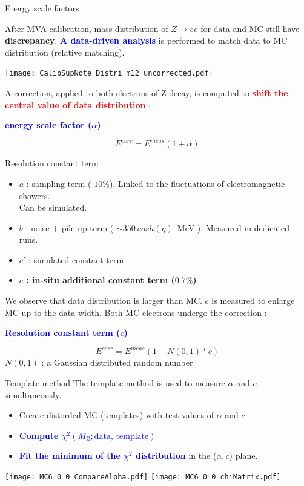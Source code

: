 \begin{frame}{Energy scale factors}
  \begin{minipage}{0.49\linewidth}
    After MVA calibration, mass distribution of $Z\rightarrow ee$ for data and MC still have {\bf discrepancy}.
    \newline
    \textcolor{blue}{\bf A data-driven analysis } is performed to match data to MC distribution (relative matching).
  \end{minipage}
  \hfill
  \begin{minipage}{0.49\linewidth}
    \texttt{[image: CalibSupNote\_Distri\_m12\_uncorrected.pdf]}
  \end{minipage}

A correction, applied to both electrons of Z decay, is computed to \textcolor{red}{\bf shift the central value of data distribution} : 
\begin{center} \textcolor{blue}{\bf energy scale factor ($\alpha$)} \end{center}
$$E^{corr}=E^{meas}(1+\alpha)$$
\end{frame}

\begin{frame}{Resolution constant term}
  
  \begin{itemize}
  \item $a$ : sampling term ( $10\%$). Linked to the fluctuations of electromagnetic showers. \\Can be simulated.
  \item $b$ : noise + pile-up term ( $\sim 350~cosh(\eta )$~MeV ). Measured in dedicated runs.
  \item $c'$ : simulated constant term
  \item {\bf $c$ : in-situ additional constant term ($0.7\%$)}
  \end{itemize}
  We observe that data distribution is larger than MC. 
  $c$ is measured to enlarge MC up to the data width.
  Both MC electrons undergo the correction :
  \begin{center}\textcolor{blue}{\bf Resolution constant term ($c$) }\end{center}
  $$E^{corr} = E^{meas}(1+N(0,1)*c)$$
  $N(0,1)$ : a Gaussian distributed random number
\end{frame}

\begin{frame}{Template method}
  The template method is used to measure $\alpha$ and $c$ simultaneously.
  \begin{itemize}
  \item Create distorded MC (templates) with test values of $\alpha$ and $c$
  \item \textcolor{blue}{\bf Compute $\chi^2( M_Z; \text{data, template})$}
  \item \textcolor{blue}{\bf Fit the minimum of the $\chi^2$ distribution} in the ($\alpha,c$) plane.
  \end{itemize}
  \hfill
  \texttt{[image: MC6\_0\_0\_CompareAlpha.pdf]}
  \texttt{[image: MC6\_0\_0\_chiMatrix.pdf]}
\end{frame}

